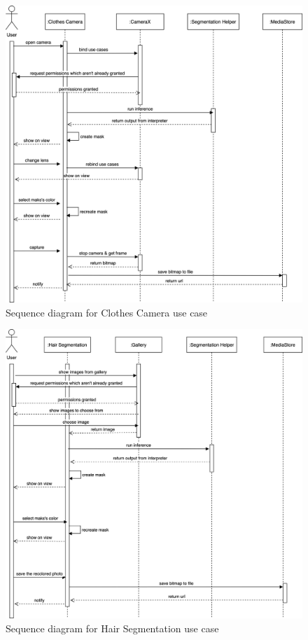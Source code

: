 \begin{figure}[H]
    \centering
    \includegraphics[width=1.0\textwidth]{chapter3/image/clothescamera.png}
    \caption{Sequence diagram for Clothes Camera use case}
    \label{fig:my_label}
\end{figure}

\begin{figure}[H]
    \centering
    \includegraphics[width=1.0\textwidth]{chapter3/image/hairsegmentation.png}
    \caption{Sequence diagram for Hair Segmentation use case}
    \label{fig:my_label}
\end{figure}
